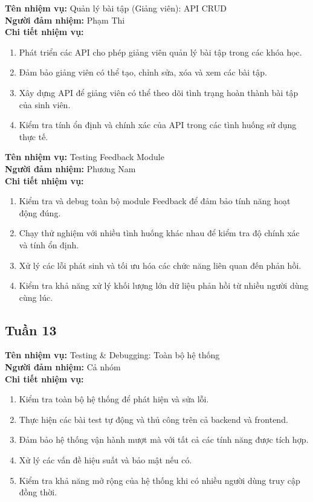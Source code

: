 \noindent \textbf{Tên nhiệm vụ:} Quản lý bài tập (Giảng viên): API CRUD \\
\noindent \textbf{Người đảm nhiệm:} Phạm Thi \\
\noindent \textbf{Chi tiết nhiệm vụ:} 
\begin{enumerate}[label=-]
    \item Phát triển các API cho phép giảng viên quản lý bài tập trong các khóa học. 
    \item Đảm bảo giảng viên có thể tạo, chỉnh sửa, xóa và xem các bài tập. 
    \item Xây dựng API để giảng viên có thể theo dõi tình trạng hoàn thành bài tập của sinh viên. 
    \item Kiểm tra tính ổn định và chính xác của API trong các tình huống sử dụng thực tế.
\end{enumerate}

\noindent \textbf{Tên nhiệm vụ:} Testing Feedback Module \\
\noindent \textbf{Người đảm nhiệm:} Phương Nam \\
\noindent \textbf{Chi tiết nhiệm vụ:} 
\begin{enumerate}[label=-]
    \item Kiểm tra và debug toàn bộ module Feedback để đảm bảo tính năng hoạt động đúng. 
    \item Chạy thử nghiệm với nhiều tình huống khác nhau để kiểm tra độ chính xác và tính ổn định. 
    \item Xử lý các lỗi phát sinh và tối ưu hóa các chức năng liên quan đến phản hồi. 
    \item Kiểm tra khả năng xử lý khối lượng lớn dữ liệu phản hồi từ nhiều người dùng cùng lúc.
\end{enumerate}

\subsection*{Tuần 13}

\noindent \textbf{Tên nhiệm vụ:} Testing \& Debugging: Toàn bộ hệ thống \\
\noindent \textbf{Người đảm nhiệm:} Cả nhóm \\
\noindent \textbf{Chi tiết nhiệm vụ:} 
\begin{enumerate}[label=-]
    \item Kiểm tra toàn bộ hệ thống để phát hiện và sửa lỗi. 
    \item Thực hiện các bài test tự động và thủ công trên cả backend và frontend. 
    \item Đảm bảo hệ thống vận hành mượt mà với tất cả các tính năng được tích hợp. 
    \item Xử lý các vấn đề hiệu suất và bảo mật nếu có. 
    \item Kiểm tra khả năng mở rộng của hệ thống khi có nhiều người dùng truy cập đồng thời.
\end{enumerate}

